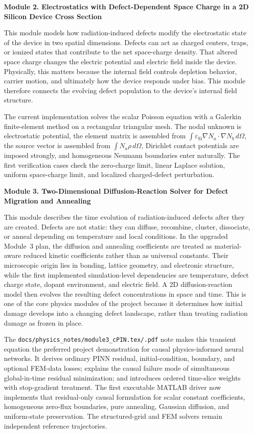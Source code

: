 \documentclass[11pt]{article}
\begin{document}
\textbf{Module 2. Electrostatics with Defect-Dependent Space Charge in a 2D Silicon Device Cross Section}

This module models how radiation-induced defects modify the electrostatic state of the device in two spatial dimensions. Defects can act as charged centers, traps, or ionized states that contribute to the net space-charge density. That altered space charge changes the electric potential and electric field inside the device. Physically, this matters because the internal field controls depletion behavior, carrier motion, and ultimately how the device responds under bias. This module therefore connects the evolving defect population to the device's internal field structure.

The current implementation solves the scalar Poisson equation with a Galerkin finite-element method on a rectangular triangular mesh. The nodal unknown is electrostatic potential, the element matrix is assembled from $\int \varepsilon_{\mathrm{Si}} \nabla N_a\cdot\nabla N_b\,d\Omega$, the source vector is assembled from $\int N_a\rho\,d\Omega$, Dirichlet contact potentials are imposed strongly, and homogeneous Neumann boundaries enter naturally. The first verification cases check the zero-charge limit, linear Laplace solution, uniform space-charge limit, and localized charged-defect perturbation.

\textbf{Module 3. Two-Dimensional Diffusion-Reaction Solver for Defect Migration and Annealing}

This module describes the time evolution of radiation-induced defects after they are created. Defects are not static: they can diffuse, recombine, cluster, dissociate, or anneal depending on temperature and local conditions. In the upgraded Module~3 plan, the diffusion and annealing coefficients are treated as material-aware reduced kinetic coefficients rather than as universal constants. Their microscopic origin lies in bonding, lattice geometry, and electronic structure, while the first implemented simulation-level dependencies are temperature, defect charge state, dopant environment, and electric field. A 2D diffusion-reaction model then evolves the resulting defect concentrations in space and time. This is one of the core physics modules of the project because it determines how initial damage develops into a changing defect landscape, rather than treating radiation damage as frozen in place.

The \texttt{docs/physics\_notes/module3\_cPIN.tex/.pdf} note makes this transient equation the preferred project demonstration for causal physics-informed neural networks. It derives ordinary PINN residual, initial-condition, boundary, and optional FEM-data losses; explains the causal failure mode of simultaneous global-in-time residual minimization; and introduces ordered time-slice weights with stop-gradient treatment. The first executable MATLAB driver now implements that residual-only causal formulation for scalar constant coefficients, homogeneous zero-flux boundaries, pure annealing, Gaussian diffusion, and uniform-state preservation. The structured-grid and FEM solvers remain independent reference trajectories.
\end{document}
